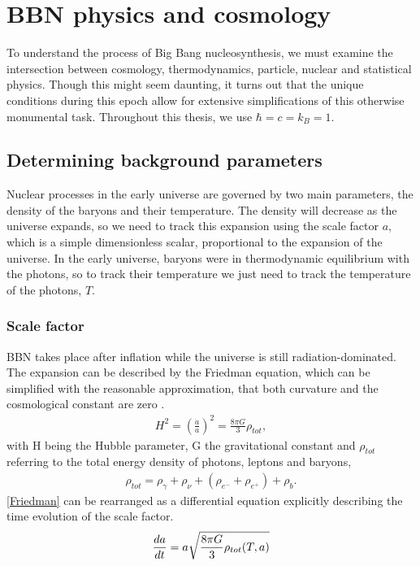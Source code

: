 
\chapter{BBN physics and cosmology}
\label{chap:theory}

To understand the process of Big Bang nucleosynthesis, we must examine the intersection between cosmology, thermodynamics, particle, nuclear and statistical physics. Though this might seem daunting, it turns out that the unique conditions during this epoch allow for extensive simplifications of this otherwise monumental task. Throughout this thesis, we use $\hbar=c=k_B=1$.



\section{Determining background parameters}
\label{sec:Background}
Nuclear processes in the early universe are governed by two main parameters, the density of the baryons and their temperature. The density will decrease as the universe expands, so we need to track this expansion using the scale factor $a$, which is a simple dimensionless scalar, proportional to the expansion of the universe. In the early universe, baryons were in thermodynamic equilibrium with the photons, so to track their temperature we just need to track the temperature of the photons, $T$. 


\subsection{Scale factor}
\label{ssec:cosmology}

BBN takes place after inflation while the universe is still radiation-dominated. The expansion can be described by the Friedman equation, which can be simplified with the reasonable approximation, that both curvature and the cosmological constant are zero \cite[{(4.29)}]{Ryden}. 
\begin{align}
    H^2=\left(\frac{\dot{a}}{a}\right)^2=\frac{8\pi G}{3}\rho_{tot},
    \label{Friedman}
\end{align}
with H being the Hubble parameter, G the gravitational constant and $\rho_{tot}$ referring to the total energy density of photons, leptons and baryons,
\begin{align}
    \rho_{tot}=\rho_{\gamma}+\rho_{\nu}+(\rho_{e^-}+\rho_{e^+})+\rho_{b}.
\end{align}
\eqref{Friedman} can be rearranged as a differential equation explicitly describing the time evolution of the scale factor.
\begin{align}
    \frac{da}{dt}=a\sqrt{\frac{8\pi G}{3}\rho_{tot}(T,a)}
    \label{eq:dadt}
\end{align}

